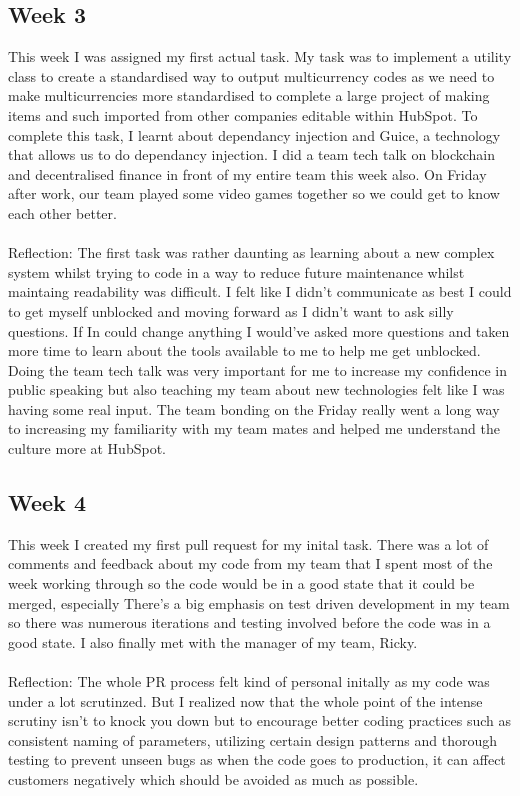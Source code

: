 \documentclass[12pt]{article} %
\begin{document}
\subsection{Week 3}
This week I was assigned my first actual task. My task was to implement a utility class to create a standardised way to output multicurrency codes as we need to make multicurrencies more standardised to complete a large project of making items and such imported from other companies editable within HubSpot. To complete this task, I learnt about dependancy injection and Guice, a technology that allows us to do dependancy injection. I did a team tech talk on blockchain and decentralised finance in front of my entire team this week also. On Friday after work, our team played some video games together so we could get to know each other better.
\\\\
Reflection: The first task was rather daunting as learning about a new complex system whilst trying to code in a way to reduce future maintenance whilst maintaing readability was difficult. I felt like I didn't communicate as best I could to get myself unblocked and moving forward as I didn't want to ask silly questions. If In could change anything I would've asked more questions and taken more time to learn about the tools available to me to help me get unblocked. Doing the team tech talk was very important for me to increase my confidence in public speaking but also teaching my team about new technologies felt like I was having some real input. The team bonding on the Friday really went a long way to increasing my familiarity with my team mates and helped me understand the culture more at HubSpot.
\subsection{Week 4}
This week I created my first pull request for my inital task. There was a lot of comments and feedback about my code from my team that I spent most of the week working through so the code would be in a good state that it could be merged, especially There's a big emphasis on test driven development in my team so there was numerous iterations and testing involved before the code was in a good state. I also finally met with the manager of my team, Ricky. 
\\\\
Reflection: The whole PR process felt kind of personal initally as my code was under a lot scrutinzed. But I realized now that the whole point of the intense scrutiny isn't to knock you down but to encourage better coding practices such as consistent naming of parameters, utilizing certain design patterns and thorough testing to prevent unseen bugs as when the code goes to production, it can affect customers negatively which should be avoided as much as possible. 
\end{document}
